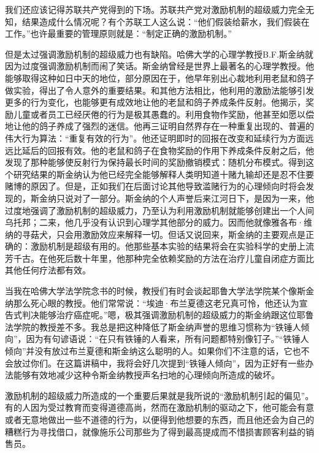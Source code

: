我们还应该记得苏联共产党得到的下场。苏联共产党对激励机制的超级威力完全无知，结果造成什么情况呢？有个苏联工人这么说：“他们假装给薪水，我们假装在工作。”也许最重要的管理原则就是：“制定正确的激励机制。”
\par

但是太过强调激励机制的超级威力也有缺陷。哈佛大学的心理学教授B.F.斯金纳就因为过度强调激励机制而闹了笑话。斯金纳曾经是世界上最著名的心理学教授。他能够取得这种如日中天的地位，部分原因在于，他早年别出心裁地利用老鼠和鸽子做实验，得出了令人意外的重要结果。和其他方法相比，他利用的激励法能够引发更多的行为变化，也能够更有成效地让他的老鼠和鸽子养成条件反射。他揭示，奖励儿童或者员工已经厌倦的行为是极其愚蠢的。利用食物作奖励，他甚至如愿以偿地让他的鸽子养成了强烈的迷信。他再三证明自然界存在一种重复出现的、普遍的伟大行为算法：“重复有效的行为”。他还证明即时的回报在改变和延续行为方面远远比延后的回报有效。他的老鼠和鸽子在食物奖励的作用下养成条件反射之后，他发现了那种能够使反射行为保持最长时间的奖励撤销模式：随机分布模式。得到这个研究结果的斯金纳认为他已经完全能够解释人类明知道十赌九输却还是忍不住要赌博的原因了。但是，正如我们在后面讨论其他导致滥赌行为的心理倾向时将会发现的，斯金纳只说对了一部分。斯金纳的个人声誉后来江河日下，是因为一来，他过度地强调了激励机制的超级威力，乃至认为利用激励机制就能够创建出一个人间乌托邦；二来，他几乎没有认识到心理学其他部分的威力。因而他就像雅各布·维纳的寻菇犬，只会用激励效应来解释一切。但话又说回来，斯金纳的主要观点是正确的：激励机制是超级有用的。他那些基本实验的结果将会在实验科学的史册上流芳千古。在他死后数十年里，他那种完全依赖奖励的方法在治疗儿童自闭症方面比其他任何疗法都有效。
\par

当我在哈佛大学法学院念书的时候，教授们有时会谈起耶鲁大学法学院某个像斯金纳那么死心眼的教授。他们常常说：“埃迪·布兰夏德这老兄真可怜，他还认为宣告式判决能够治疗癌症呢。”嗯，极其强调激励机制的超级威力的斯金纳跟这位耶鲁法学院的教授差不多。我总是把这种降低了斯金纳声誉的思维习惯称为“铁锤人倾向”，因为有句谚语说：“在只有铁锤的人看来，所有问题都特别像钉子。”“铁锤人倾向”并没有放过布兰夏德和斯金纳这么聪明的人。如果你们不注意的话，它也不会放过你们。在这篇讲稿中，我将会好几次提到“铁锤人倾向”，因为正好有一些办法能够有效地减少这种令斯金纳教授声名扫地的心理倾向所造成的破坏。
\par

激励机制的超级威力所造成的一个重要后果就是我所说的“激励机制引起的偏见”。有的人因为受过教育而变得道德高尚，然而在激励机制的驱动之下，他可能会有意或者无意地做出一些不道德的行为，以便得到他想要的东西，而且他还会为自己的糟糕行为寻找借口，就像施乐公司那些为了得到最高提成而不惜损害顾客利益的销售员。
\par

